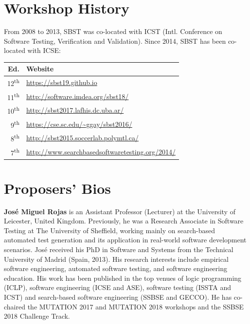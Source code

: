 \documentclass[10pt,conference]{IEEEtran}
\newcommand{\TODO}[1]{\textbf{\textcolor{ScarletRed}{[TODO: #1]}}\xspace}
\newcommand{\TODO}[1]{}
\begin{document}
\section{Workshop History}

From 2008 to 2013, SBST was co-located with ICST (Intl. Conference on
Software Testing, Verification and Validation). Since 2014, SBST has
been co-located with ICSE:%
\begin{table}[h]
\centering
\begin{tabular}{rl}\toprule
Ed. & Website \\\midrule
12\textsuperscript{th} & \url{https://sbst19.github.io} \\
11\textsuperscript{th} & \url{http://software.imdea.org/sbst18/} \\
10\textsuperscript{th} & \url{http://sbst2017.lafhis.dc.uba.ar/} \\
9\textsuperscript{th}  & \url{https://cse.sc.edu/~ggay/sbst2016/} \\
8\textsuperscript{th}  & \url{http://sbst2015.soccerlab.polymtl.ca/} \\
7\textsuperscript{th}  & \url{http://www.searchbasedsoftwaretesting.org/2014/}\\\bottomrule
\end{tabular}
\end{table}


\section{Proposers' Bios}

{\bf Jos\'e Miguel Rojas} is an Assistant Professor (Lecturer) at the
University of Leicester, United Kingdom. Previously, he was a Research
Associate in Software Testing at The University of Sheffield, working
mainly on search-based automated test generation and its application
in real-world software development scenarios. Jos\'e received his PhD
in Software and Systems from the Technical University of Madrid
(Spain, 2013). His research interests include empirical software
engineering, automated software testing, and software engineering
education. His work has been published in the top venues of logic
programming (ICLP), software engineering (ICSE and ASE), software
testing (ISSTA and ICST) and search-based software engineering (SSBSE
and GECCO). He has co-chaired the MUTATION 2017 and MUTATION 2018
workshops and the SSBSE 2018 Challenge Track.
\end{document}
